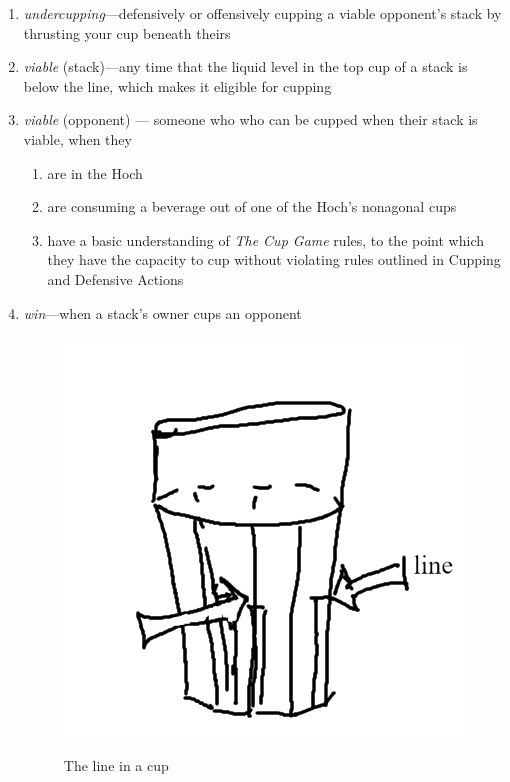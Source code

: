 \documentclass[12pt]{IEEEconf}
\begin{document}
\begin{enumerate}
    \item \textit{undercupping}---defensively or offensively cupping a viable opponent's stack by thrusting your cup beneath theirs
    \item \textit{viable} (stack)---any time that the liquid level in the top cup of a stack is below the line, which makes it eligible for cupping
    \item \textit{viable} (opponent) --- someone who who can be cupped when their stack is viable, when they
          \begin{enumerate}
              \item are in the Hoch
              \item are consuming a beverage out of one of the Hoch's nonagonal cups
              \item have a basic understanding of \textit{The Cup Game} rules, to the point which they have the capacity to cup without violating rules outlined in Cupping and Defensive Actions
          \end{enumerate}
    \item \textit{win}---when a stack's owner cups an opponent
          \begin{figure}
              \begin{center}
                  \includegraphics[width=0.7\linewidth]{fig/line.png}
                  \label{fig:line}
                  \caption{The line in a cup}
              \end{center}
          \end{figure}
          \begin{figure}
            \begin{center}

\end{center}
\end{figure}
\end{enumerate}
\end{document}
